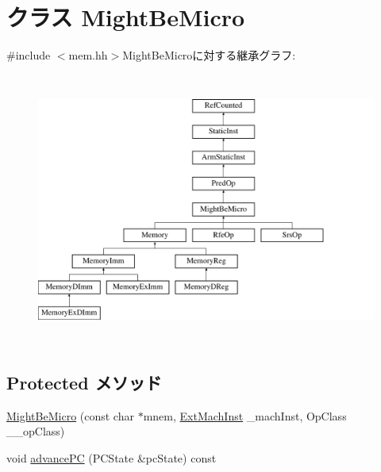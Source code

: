 \hypertarget{classArmISA_1_1MightBeMicro}{
\section{クラス MightBeMicro}
\label{classArmISA_1_1MightBeMicro}
}


{\ttfamily \#include $<$mem.hh$>$}MightBeMicroに対する継承グラフ:\begin{figure}[H]
\begin{center}
\leavevmode
\includegraphics[height=9cm]{classArmISA_1_1MightBeMicro}
\end{center}
\end{figure}
\subsection*{Protected メソッド}
\begin{DoxyCompactItemize}
\item 
\hyperlink{classArmISA_1_1MightBeMicro_ac2a6672be551ef838c8df04c8079f2dc}{MightBeMicro} (const char $\ast$mnem, \hyperlink{classStaticInst_a5605d4fc727eae9e595325c90c0ec108}{ExtMachInst} \_\-machInst, OpClass \_\-\_\-opClass)
\item 
void \hyperlink{classArmISA_1_1MightBeMicro_af04cd01429462d48e635f3e01ced6257}{advancePC} (PCState \&pcState) const 
\end{DoxyCompactItemize}


